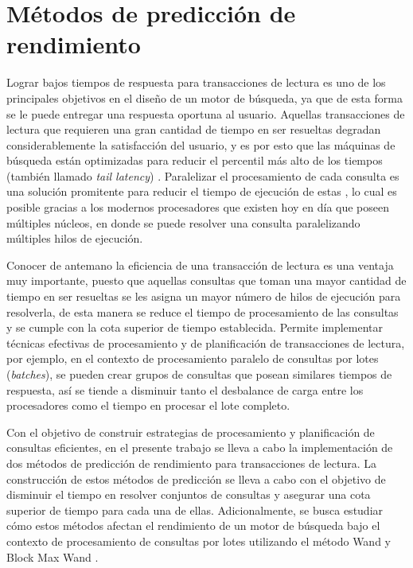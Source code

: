\chapter{Métodos de predicción de rendimiento}
\label{cap:prediccion}
Lograr bajos tiempos de respuesta para transacciones de lectura es uno de los principales objetivos en el diseño de un motor de búsqueda, ya que de esta forma se le puede entregar una respuesta oportuna al usuario. Aquellas transacciones de lectura que requieren una gran cantidad de tiempo en ser resueltas degradan considerablemente la satisfacción del usuario, y es por esto que las máquinas de búsqueda están optimizadas para reducir el percentil más alto de los tiempos (también llamado \textit{tail latency}) \citep{Jeon:2014}. Paralelizar el procesamiento de cada consulta es una solución promitente para reducir el tiempo de ejecución de estas \citep{Jeon:2013, Tatikonda:2011}, lo cual es posible gracias a los modernos procesadores que existen hoy en día que poseen múltiples núcleos, en donde se puede resolver una consulta paralelizando múltiples hilos de ejecución.

Conocer de antemano la eficiencia de una transacción de lectura es una ventaja muy importante, puesto que aquellas consultas que toman una mayor cantidad de tiempo en ser resueltas se les asigna un mayor número de hilos de ejecución para resolverla, de esta manera se reduce el tiempo de procesamiento de las consultas y se cumple con la cota superior de tiempo establecida. Permite implementar técnicas efectivas de procesamiento y de planificación de transacciones de lectura, por ejemplo, en el contexto de procesamiento paralelo de consultas por lotes (\textit{batches}), se pueden crear grupos de consultas que posean similares tiempos de respuesta, así se tiende a disminuir tanto el desbalance de carga entre los procesadores como el tiempo en procesar el lote completo.

Con el objetivo de construir estrategias de procesamiento y planificación de consultas eficientes, en el presente trabajo se lleva a cabo la implementación de dos métodos de predicción de rendimiento para transacciones de lectura. La construcción de estos métodos de predicción se lleva a cabo con el objetivo de disminuir el tiempo en resolver conjuntos de consultas y asegurar una cota superior de tiempo para cada una de ellas. Adicionalmente, se busca estudiar cómo estos métodos afectan el rendimiento de un motor de búsqueda bajo el contexto de procesamiento de consultas por lotes utilizando el método Wand \citep{Broder:2003} y Block Max Wand \citep{Ding:2011}.


